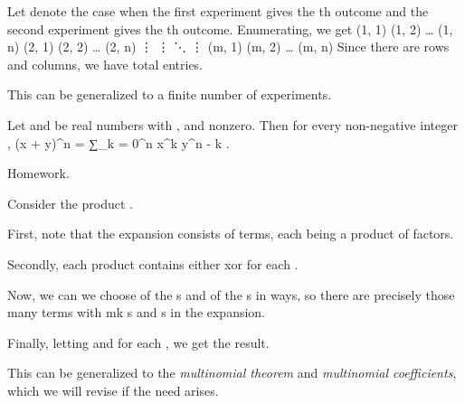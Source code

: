 		\startproof
			Let  denote the case when the first experiment gives the th outcome and the second experiment gives the th outcome. Enumerating, we get
			\startformula  \startmatrix[n=4]
				\NC  (1, 1)  \NC  (1, 2)  \NC  …  \NC  (1, n)  \NR
				\NC  (2, 1)  \NC  (2, 2)  \NC  …  \NC  (2, n)  \NR
				\NC  ⋮       \NC  ⋮       \NC  ⋱  \NC  ⋮       \NR
				\NC  (m, 1)  \NC  (m, 2)  \NC  …  \NC  (m, n)  \NR
			\stopmatrix	 \stopformula
			Since there are  rows and  columns, we have total  entries.
		\stopproof

		\startremark
			This can be generalized to a finite number of experiments.
		\stopremark


		\starttheorem [title={Binomial theorem}]
			Let  and  be real numbers with ,  and  nonzero. Then for every non-negative integer ,
			\startformula
				(x + y)^n = ∑_{k = 0}^n  x^k y^{n - k} .
			\stopformula
		\stoptheorem
		
		\startproof [title={Inductive}]
			Homework.
		\stopproof

		\startproof [title={Combinatorial}]
			Consider the product .

			First, note that the expansion consists of  terms, each being a product of  factors.

			Secondly, each product contains either  xor  for each .


			Now, we can we choose  of the s and  of the s in  ways, so there are precisely those many terms with m{k} s and  s in the expansion.

			Finally, letting  and  for each , we get the result.
		\stopproof

		\startremark
			This can be generalized to the \emph{multinomial theorem} and \emph{multinomial coefficients}, which we will revise if the need arises.
		\stopremark

	\stopsection

\stopchapter
